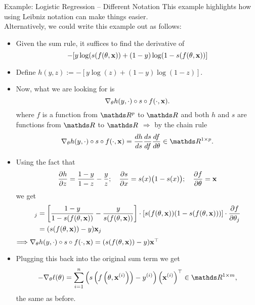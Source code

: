 \documentclass[11pt,compress,t,notes=noshow, xcolor=table]{beamer}
\newcommand{\deriv}{d}
\begin{document}
\begin{vbframe}{Example: Logistic Regression -- Different Notation}
This example highlights how using Leibniz notation can make things easier.\\
Alternatively, we could write this example out as follows:
\begin{itemize}
    \item Given the sum rule, it suffices to find the derivative of 
\[
-[y \log (s(f(\theta,\mathbf{x}))+(1-y) \log (1-s(f(\theta,\mathbf{x}))]
\]
\item Define $h(y,z):=-[y \log (z)+(1-y) \log (1-z)]$.
\item Now, what we are looking for is 
\[
\nabla_\theta h(y,\cdot)\circ s \circ f(\cdot,\mathbf{x}).
\]
where $f$ is a function from $\R^p$ to $\R$ and both $h$ and $s$ are functions from $\R$ to $\R$
$\Longrightarrow$ by the chain rule
$$
\nabla_\theta h(y,\cdot)\circ s \circ f(\cdot,\xv)=\frac{\deriv h}{\deriv s} \frac{\deriv s}{\deriv f} \frac{\deriv f}{\deriv \theta}\in\R^{1\times p}.
$$
\end{itemize}\framebreak
\begin{itemize}
    \item Using the fact that $$\frac{\partial h}{\partial z}=\frac{1-y}{1-z}-\frac{y}{z};\quad\frac{\partial s}{\partial x}=s(x)\big(1-s(x)\big);\quad\frac{\partial f}{\partial \theta}=\mathbf{x}$$ we get \begin{align*}
   [\nabla_\theta h(y,\cdot)\circ s \circ f(\cdot,\xv)]_j&=\left[\frac{1-y}{1-s(f(\theta,\xv))}-\frac{y}{s(f(\theta,\xv))}\right] \cdot \left[s(f(\theta,\xv))(1-s(f(\theta,\xv)))\right]\cdot \frac{\partial f}{\partial\theta_j}\\
   &=(s(f(\theta,\xv))-y)\xv_j
\end{align*}
$\Longrightarrow \nabla_\theta h(y,\cdot)\circ s \circ f(\cdot,\mathbf{x})=(s(f(\theta,\mathbf{x}))-y)\mathbf{x}^\top$
\item Plugging this back into the original sum term we get $$
-\nabla_\theta \ell (\theta)=\sumin\left(s\left(f\left(\theta,\xv^{(i)}\right)\right)-y^{(i)}\right)\left(\xv^{(i)}\right)^\top\in\R^{1\times m},
$$ the same as before.
\end{itemize}
\end{vbframe}
\end{document}
